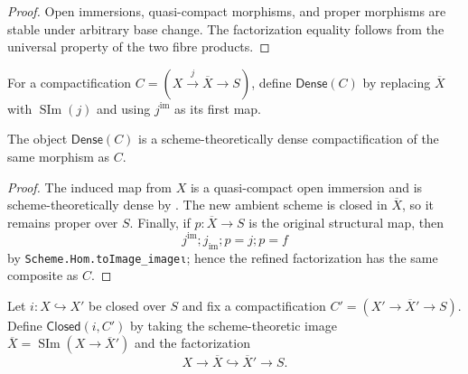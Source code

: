 \begin{proof}
  Open immersions, quasi-compact morphisms, and proper morphisms are stable
  under arbitrary base change.  The factorization equality follows from the
  universal property of the two fibre products.
\end{proof}

\begin{definition}
  \label{def:nagata-dense-refinement}

  For a compactification $C=(X\xrightarrow{j}\overline X\to S)$, define
  $\mathsf{Dense}(C)$ by replacing $\overline X$ with
  $\operatorname{SIm}(j)$ and using $j^{\mathrm{im}}$ as its first map.
\end{definition}

\begin{proposition}
  \label{prop:nagata-dense-refinement}

  The object $\mathsf{Dense}(C)$ is a scheme-theoretically dense
  compactification of the same morphism as $C$.
\end{proposition}

\begin{proof}
  The induced map from $X$ is a quasi-compact open immersion and is
  scheme-theoretically dense by
  .  The new ambient scheme
  is closed in $\overline X$, so it remains proper over $S$.  Finally, if
  $p\colon\overline X\to S$ is the original structural map, then
  \[
    j^{\mathrm{im}};j_{\mathrm{im}};p
      =j;p=f
  \]
  by \texttt{Scheme.Hom.toImage\_imageι}; hence the refined factorization has
  the same composite as $C$.
\end{proof}

\begin{definition}
  \label{def:nagata-closed-subscheme-compactification}

  Let $i\colon X\hookrightarrow X'$ be closed over $S$ and fix a
  compactification $C'=(X'\to\overline X'\to S)$.  Define
  $\mathsf{Closed}(i,C')$ by taking the scheme-theoretic image
  $\overline X=\operatorname{SIm}(X\to\overline X')$ and the factorization
  \[
    X\longrightarrow\overline X\hookrightarrow\overline X'\longrightarrow S.
  \]
\end{definition}

